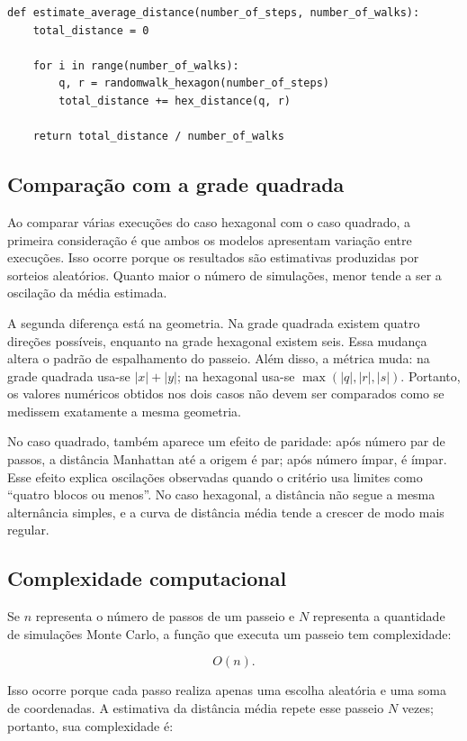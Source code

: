 \documentclass[12pt,a4paper]{article}
\begin{document}
\begin{lstlisting}
def estimate_average_distance(number_of_steps, number_of_walks):
    total_distance = 0

    for i in range(number_of_walks):
        q, r = randomwalk_hexagon(number_of_steps)
        total_distance += hex_distance(q, r)

    return total_distance / number_of_walks
\end{lstlisting}

\subsection{Comparação com a grade quadrada}

Ao comparar várias execuções do caso hexagonal com o caso quadrado, a primeira consideração é que ambos os modelos apresentam variação entre execuções. Isso ocorre porque os resultados são estimativas produzidas por sorteios aleatórios. Quanto maior o número de simulações, menor tende a ser a oscilação da média estimada.

A segunda diferença está na geometria. Na grade quadrada existem quatro direções possíveis, enquanto na grade hexagonal existem seis. Essa mudança altera o padrão de espalhamento do passeio. Além disso, a métrica muda: na grade quadrada usa-se $|x|+|y|$; na hexagonal usa-se $\max(|q|,|r|,|s|)$. Portanto, os valores numéricos obtidos nos dois casos não devem ser comparados como se medissem exatamente a mesma geometria.

No caso quadrado, também aparece um efeito de paridade: após número par de passos, a distância Manhattan até a origem é par; após número ímpar, é ímpar. Esse efeito explica oscilações observadas quando o critério usa limites como ``quatro blocos ou menos''. No caso hexagonal, a distância não segue a mesma alternância simples, e a curva de distância média tende a crescer de modo mais regular.

\subsection{Complexidade computacional}

Se $n$ representa o número de passos de um passeio e $N$ representa a quantidade de simulações Monte Carlo, a função que executa um passeio tem complexidade:

\[
O(n).
\]

Isso ocorre porque cada passo realiza apenas uma escolha aleatória e uma soma de coordenadas. A estimativa da distância média repete esse passeio $N$ vezes; portanto, sua complexidade é:
\end{document}
